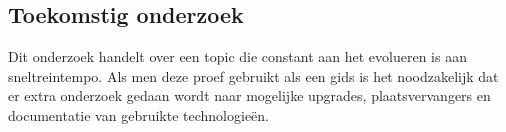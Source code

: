 \documentclass[a0,portrait]{hogent-poster}
\begin{document}
\begin{multicols}{2}
	\section{Toekomstig onderzoek}
	Dit onderzoek handelt over een topic die constant aan het evolueren is aan sneltreintempo.
	Als men deze proef gebruikt als een gids is het noodzakelijk dat er extra onderzoek gedaan wordt naar mogelijke upgrades, plaatsvervangers en documentatie van gebruikte technologieën.

\end{multicols}
\begin{figure}[h]

\end{figure}
\end{document}
